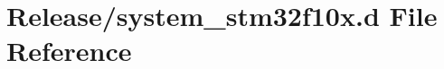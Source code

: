 \hypertarget{system__stm32f10x_8d}{}\section{Release/system\+\_\+stm32f10x.d File Reference}
\label{system__stm32f10x_8d}
